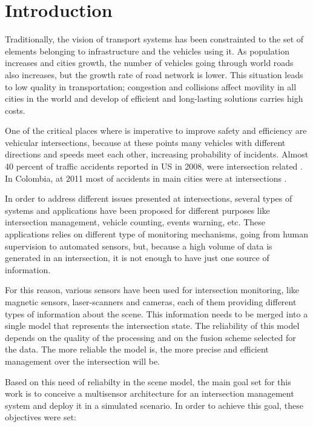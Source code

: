 \chapter*{Introduction}
%

Traditionally, the vision of transport systems has been constrainted to the set of elements belonging to infrastructure and the vehicles using it. As population increases and cities growth, the number of vehicles going through world roads also increases, but the growth rate of road network is lower. This situation leads to low quality in transportation; congestion and collisions affect movility in all cities in the world and develop of efficient and long-lasting solutions carries high costs.

One of the critical places where is imperative to improve safety and efficiency are vehicular intersections, because at these points many vehicles with different directions and speeds meet each other, increasing probability of incidents. Almost 40 percent of traffic accidents reported in US in 2008, were intersection related \cite{Choi2010}. In Colombia, at 2011 most of accidents in main cities were at intersections \cite{CorporacionFondodePrevencionVial2010}.

In order to address different issues presented at intersections, several types of systems and applications have been proposed for different purposes like intersection management, vehicle counting, events warning, etc. These applications relies on different type of monitoring mechanisms, going from human supervision to automated sensors, but, because a high volume of data is generated in an intersection, it is not enough to have just one source of information.

For this reason, various sensors have been used for intersection monitoring, like magnetic sensors, laser-scanners and cameras, each of them providing different types of information about the scene. This information needs to be merged into a single model that represents the intersection state. The reliability of this model depends on the quality of the processing and on the fusion scheme selected for the data. The more reliable the model is, the more precise and efficient management over the intersection will be.

Based on this need of reliabilty in the scene model, the main goal set for this work is to conceive a multisensor architecture for an intersection management system and deploy it in a simulated scenario. In order to achieve this goal, these objectives were set:

